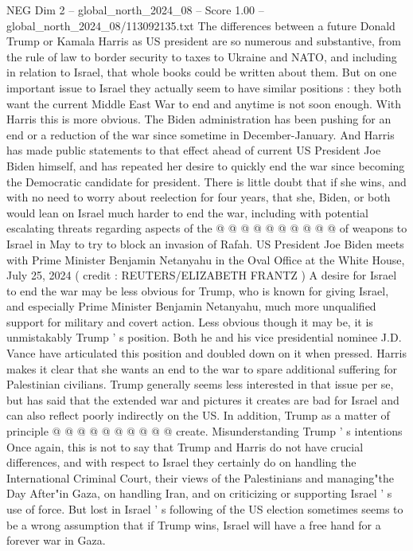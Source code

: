 \begin{textsample}{NEG Dim 2 – global\_north\_2024\_08 – Score 1.00 – global\_north\_2024\_08/113092135.txt}  \label{ex:f2_neg_054}
The differences between a future Donald Trump or Kamala Harris as US president are so numerous and substantive, from the rule of law to border security to taxes to Ukraine and NATO, and including in relation to Israel, that whole books could be written about them.
But on one important issue to Israel they actually seem to have similar positions : they both want the current Middle East War to end and anytime is not soon enough.
With Harris this is more obvious.
The Biden administration has been pushing for an end or a reduction of the war since sometime in December-January.
And Harris has made public statements to that effect ahead of current US President Joe Biden himself, and has repeated her desire to quickly end the war since becoming the Democratic candidate for president.
There is little doubt that if she wins, and with no need to worry about reelection for four years, that she, Biden, or both would lean on Israel much harder to end the war, including with potential escalating threats regarding aspects of the @ @ @ @ @ @ @ @ @ @ of weapons to Israel in May to try to block an invasion of Rafah.
US President Joe Biden meets with Prime Minister Benjamin Netanyahu in the Oval Office at the White House, July 25, 2024 ( credit : REUTERS/ELIZABETH FRANTZ ) A desire for Israel to end the war may be less obvious for Trump, who is known for giving Israel, and especially Prime Minister Benjamin Netanyahu, much more unqualified support for military and covert action.
Less obvious though it may be, it is unmistakably Trump ' s position.
Both he and his vice presidential nominee J.D.
Vance have articulated this position and doubled down on it when pressed.
Harris makes it clear that she wants an end to the war to spare additional suffering for Palestinian civilians.
Trump generally seems less interested in that issue per se, but has said that the extended war and pictures it creates are bad for Israel and can also reflect poorly indirectly on the US.
In addition, Trump as a matter of principle @ @ @ @ @ @ @ @ @ @ create.
Misunderstanding Trump ' s intentions Once again, this is not to say that Trump and Harris do not have crucial differences, and with respect to Israel they certainly do on handling the International Criminal Court, their views of the Palestinians and managing"the Day After"in Gaza, on handling Iran, and on criticizing or supporting Israel ' s use of force.
But lost in Israel ' s following of the US election sometimes seems to be a wrong assumption that if Trump wins, Israel will have a free hand for a forever war in Gaza.

\end{textsample}
